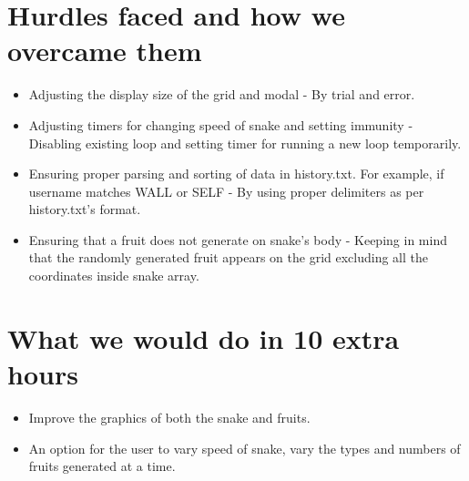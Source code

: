 \documentclass[12pt]{article}
\begin{document}
\section{Hurdles faced and how we overcame them}

\begin{itemize}[leftmargin=1.5em]
    \item Adjusting the display size of the grid and modal - By trial and error.\\
    \item Adjusting timers for changing speed of snake and setting immunity - Disabling existing loop and setting timer for running a new loop temporarily.\\
    \item Ensuring proper parsing and sorting of data in history.txt. For example, if username matches WALL or SELF - By using proper delimiters as per history.txt's format.\\
    \item Ensuring that a fruit does not generate on snake's body - Keeping in mind that the randomly generated fruit appears on the grid excluding all the coordinates inside snake array.\\
\end{itemize}

\section{What we would do in 10 extra hours}

\begin{itemize}[leftmargin=1.5em]
    \item Improve the graphics of both the snake and fruits.\\
    \item An option for the user to vary speed of snake, vary the types and numbers of fruits generated at a time.\\
\end{itemize}



\end{document}
